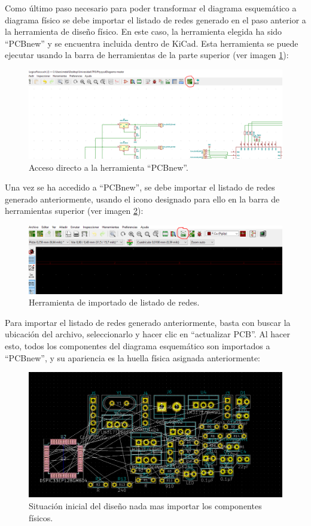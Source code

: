 Como último paso necesario para poder transformar el diagrama esquemático a diagrama físico se debe importar el listado de redes generado en el paso anterior a la herramienta de diseño físico. En este caso, la herramienta elegida ha sido ``PCBnew'' y se encuentra incluida dentro de KiCad. Esta herramienta se puede ejecutar usando la barra de herramientas de la parte superior (ver imagen \ref{fig:PCBnew}):

\begin{figure}[H]
\centering 
\includegraphics[width=0.9\linewidth]{pictures/PCBNEW.PNG}
\caption{Acceso directo a la herramienta ``PCBnew''.}
\label{fig:PCBnew}
\end{figure}

Una vez se ha accedido a ``PCBnew'', se debe importar el listado de redes generado anteriormente, usando el icono designado para ello en la barra de herramientas superior (ver imagen \ref{fig:Herramienta_Importado_Redes}):

\begin{figure}[H]
\centering 
\includegraphics[width=0.9\linewidth]{pictures/redesPCB.PNG}
\caption{Herramienta de importado de listado de redes.}
\label{fig:Herramienta_Importado_Redes}
\end{figure}

Para importar el listado de redes generado anteriormente, basta con buscar la ubicación del archivo, seleccionarlo y hacer clic en ``actualizar PCB''. Al hacer esto, todos los componentes del diagrama esquemático son importados a ``PCBnew'', y su apariencia es la huella física asignada anteriormente:

\begin{figure}[H]
\centering 
\includegraphics[width=0.9\linewidth]{pictures/bunch.PNG}
\caption{Situación inicial del diseño nada mas importar los componentes físicos.}
\end{figure}

